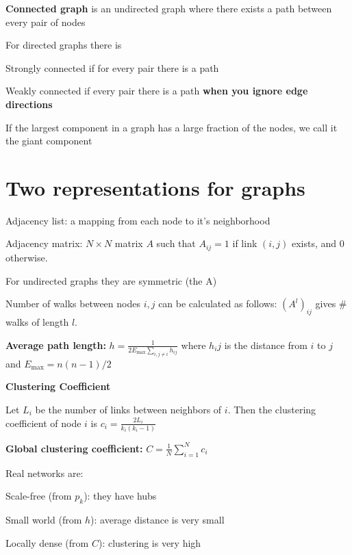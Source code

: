 \textbf{Connected graph} is an undirected graph where there exists a path between 
every pair of nodes

For directed graphs there is 
\begin{tightitemize}
    \item Strongly connected if for every pair there is a path 
    \item Weakly connected if every pair there is a path \textbf{when you
    ignore edge directions}
\end{tightitemize}

If the largest component in a graph has a large fraction of the nodes,
we call it the giant component

\section*{Two representations for graphs}

\begin{tightitemize}
    \item Adjacency list: a mapping from each node to it's neighborhood
    \item Adjacency matrix: $N \times N$ matrix $A$ such that $A_{ij} = 1$ if link 
    $(i, j)$ exists, and $0$ otherwise. 
\end{tightitemize}

\begin{tightitemize}
    \item For undirected graphs they are symmetric (the A)
    \item Number of walks between nodes $i, j$ can be calculated as follows:
        $(A^l)_{ij}$ gives $\#$walks of length $l$.
\end{tightitemize}

\textbf{Average path length:}
$
h = \frac{1}{2E_{\text{max}} \sum_{i, j \ne i}h_{ij}}
$
where $h_ij$ is the distance from $i$ to $j$ and $E_{\text{max}} = n(n-1)/2$

\textbf{Clustering Coefficient}

Let $L_i$  be the number of links between neighbors of $i$. 
Then the clustering coefficient of node $i$ is 
$
c_i = \frac{2L_i}{k_i(k_i - 1)}
$

\textbf{Global clustering coefficient:} $C = \frac{1}{N}\sum_{i=1}^{N}c_i$

Real networks are: 
\begin{tightitemize}
    \item Scale-free (from $p_k$): they have hubs
    \item Small world (from $h$): average distance is very small 
    \item Locally dense (from $C$): clustering is very high
\end{tightitemize}


